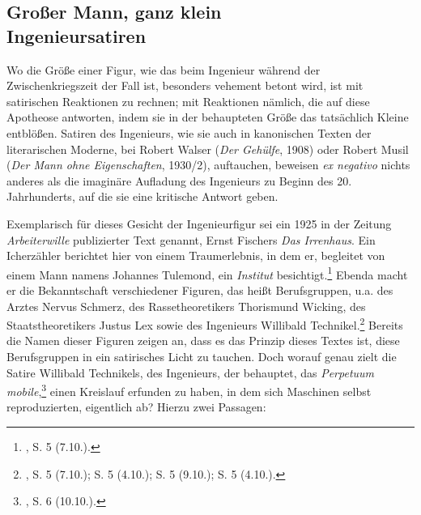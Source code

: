 \documentclass[%
	fontsize=10pt,%
	twoside,%
	headings=optiontoheadandtoc,%
	showtrims]{scrbook}
\renewenvironment{quote}{%
  \addmargin[\genericindent]{0pt}%
  \KOMAoptions{parskip=true}%
  \ifdim\parskip>0pt\else\addvspace{\intextsep}\fi
}{%
  \par
  \endaddmargin\vspace{\intextsep}
}
\begin{document}
\subsection[Großer Mann, ganz klein \textendash{}    Ingenieursatiren]{Großer Mann, ganz klein \textendash{} \- \protect\\ Ingenieursatiren}
\par Wo die Größe einer Figur, wie das beim Ingenieur während der Zwischenkriegszeit der Fall ist, besonders vehement betont wird, ist mit satirischen Reaktionen zu rechnen; mit Reaktionen nämlich, die auf diese Apotheose antworten, indem sie in der behaupteten Größe das tatsächlich Kleine entblößen. Satiren des Ingenieurs, wie sie auch in kanonischen Texten der literarischen Moderne, bei Robert Walser (\emph{Der Gehülfe}, 1908) oder Robert Musil (\emph{Der Mann ohne Eigenschaften}, 1930/2), auftauchen, beweisen \emph{ex negativo} nichts anderes als die imaginäre Aufladung des Ingenieurs zu Beginn des 20. Jahrhunderts, auf die sie eine kritische Antwort geben.\par Exemplarisch für dieses Gesicht der Ingenieurfigur sei ein 1925 in der Zeitung \emph{Arbeiterwille} publizierter Text genannt, Ernst Fischers \emph{Das Irrenhaus}. Ein Icherzähler berichtet hier von einem Traumerlebnis, in dem er, begleitet von einem Mann namens Johannes Tulemond, ein \emph{Institut} besichtigt.\footnote{\cite[][]{fischer1925a}, S. 5 (7.10.).}  Ebenda macht er die Bekanntschaft verschiedener Figuren, das heißt Berufsgruppen, u.a. des Arztes Nervus Schmerz, des Rassetheoretikers Thorismund Wicking, des Staatstheoretikers Justus Lex sowie des Ingenieurs Willibald Technikel.\footnote{\cite[][]{fischer1925a}, S. 5 (7.10.); S. 5 (4.10.); S. 5 (9.10.); S. 5 (4.10.).}  Bereits die Namen dieser Figuren zeigen an, dass es das Prinzip dieses Textes ist, diese Berufsgruppen in ein satirisches Licht zu tauchen. Doch worauf genau zielt die Satire Willibald Technikels, des Ingenieurs, der behauptet, das \emph{Perpetuum mobile},\footnote{\cite[][]{fischer1925a}, S. 6 (10.10.).}  einen Kreislauf erfunden zu haben, in dem sich Maschinen selbst reproduzierten, eigentlich ab? Hierzu zwei Passagen:\begin{quote}

\end{quote}
\end{document}
